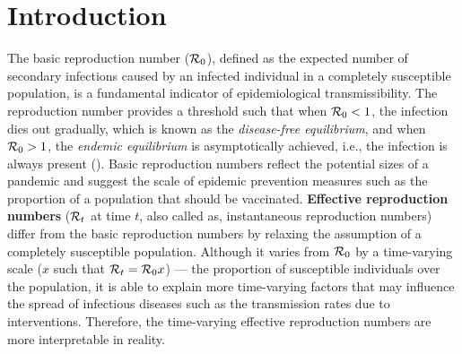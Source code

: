 \section{Introduction}
\label{sec:intro}

The basic reproduction number ($\mathcal{R}_0$), defined as the expected number of secondary infections caused by an infected individual in a completely susceptible population, is a fundamental indicator of epidemiological transmissibility. %
The reproduction number provides a threshold such that when $\mathcal{R}_0<1$, the infection dies out gradually, which is known as the \textit{disease-free equilibrium}, and when $\mathcal{R}_0>1$, the \textit{endemic equilibrium} is asymptotically achieved, i.e., the infection is always present (\cite{diekmann1990definition,delamater2019complexity,brauer2019mathematical}). Basic reproduction numbers reflect the potential sizes of a pandemic and suggest the scale of epidemic prevention measures such as the proportion of a population that should be vaccinated. %
\textbf{Effective reproduction numbers} ($\mathcal{R}_t$ at time $t$, also called as, instantaneous reproduction numbers) differ from the basic reproduction numbers by relaxing the assumption of a completely susceptible population. Although it varies from $\mathcal{R}_0$ by a time-varying scale ($x$ such that $\mathcal{R}_t=\mathcal{R}_0 x$) --- the proportion of susceptible individuals over the population, it is able to explain more time-varying factors that may influence the spread of infectious diseases such as the transmission rates due to interventions. Therefore, the time-varying effective reproduction numbers are more interpretable in reality. %

